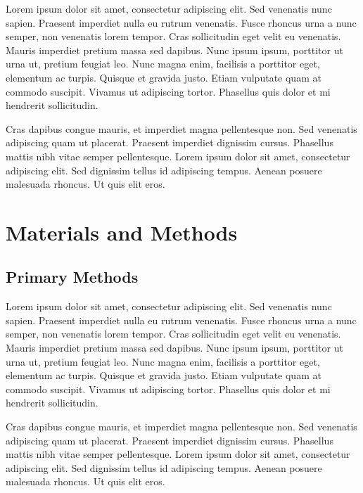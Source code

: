 \documentclass[double,12pt]{beavtex}
\begin{document}
Lorem ipsum dolor sit amet, consectetur adipiscing elit. Sed venenatis nunc sapien. Praesent imperdiet nulla eu rutrum venenatis. Fusce rhoncus urna a nunc semper, non venenatis lorem tempor. Cras sollicitudin eget velit eu venenatis. Mauris imperdiet pretium massa sed dapibus. Nunc ipsum ipsum, porttitor ut urna ut, pretium feugiat leo. Nunc magna enim, facilisis a porttitor eget, elementum ac turpis. Quisque et gravida justo. Etiam vulputate quam at commodo suscipit. Vivamus ut adipiscing tortor. Phasellus quis dolor et mi hendrerit sollicitudin. 

Cras dapibus congue mauris, et imperdiet magna pellentesque non. Sed venenatis adipiscing quam ut placerat. Praesent imperdiet dignissim cursus. Phasellus mattis nibh vitae semper pellentesque. Lorem ipsum dolor sit amet, consectetur adipiscing elit. Sed dignissim tellus id adipiscing tempus. Aenean posuere malesuada rhoncus. Ut quis elit eros.




\chapter{Materials and Methods}

\section{Primary Methods}

Lorem ipsum dolor sit amet, consectetur adipiscing elit. Sed venenatis nunc sapien. Praesent imperdiet nulla eu rutrum venenatis. Fusce rhoncus urna a nunc semper, non venenatis lorem tempor. Cras sollicitudin eget velit eu venenatis. Mauris imperdiet pretium massa sed dapibus. Nunc ipsum ipsum, porttitor ut urna ut, pretium feugiat leo. Nunc magna enim, facilisis a porttitor eget, elementum ac turpis. Quisque et gravida justo. Etiam vulputate quam at commodo suscipit. Vivamus ut adipiscing tortor. Phasellus quis dolor et mi hendrerit sollicitudin. 

Cras dapibus congue mauris, et imperdiet magna pellentesque non. Sed venenatis adipiscing quam ut placerat. Praesent imperdiet dignissim cursus. Phasellus mattis nibh vitae semper pellentesque. Lorem ipsum dolor sit amet, consectetur adipiscing elit. Sed dignissim tellus id adipiscing tempus. Aenean posuere malesuada rhoncus. Ut quis elit eros.
\end{document}
